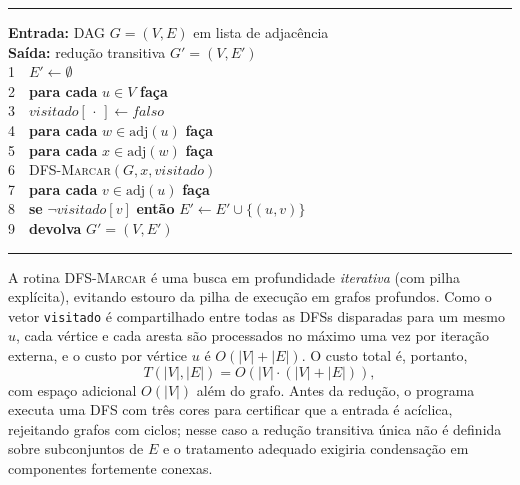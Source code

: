 \documentclass{sbc2023}%
\begin{document}
\begin{algoritmo}
\caption{Redução transitiva por caminhamento}
\label{alg:rt}
\hrule\vspace{1.5mm}
{\small
\textbf{Entrada:} DAG $G=(V,E)$ em lista de adjacência\\
\textbf{Saída:} redução transitiva $G'=(V,E')$\\[1mm]
\hspace*{0mm}1\ \ $E' \gets \emptyset$\\
\hspace*{0mm}2\ \ \textbf{para cada} $u \in V$ \textbf{faça}\\
\hspace*{4mm}3\ \ $\mathit{visitado}[\,\cdot\,] \gets \mathit{falso}$\\
\hspace*{4mm}4\ \ \textbf{para cada} $w \in \mathrm{adj}(u)$ \textbf{faça}\\
\hspace*{8mm}5\ \ \textbf{para cada} $x \in \mathrm{adj}(w)$ \textbf{faça}\\
\hspace*{12mm}6\ \ \textsc{DFS-Marcar}$(G, x, \mathit{visitado})$\\
\hspace*{4mm}7\ \ \textbf{para cada} $v \in \mathrm{adj}(u)$ \textbf{faça}\\
\hspace*{8mm}8\ \ \textbf{se} $\neg\mathit{visitado}[v]$ \textbf{então} $E' \gets E' \cup \{(u,v)\}$\\
\hspace*{0mm}9\ \ \textbf{devolva} $G'=(V,E')$
}
\vspace{1.5mm}\hrule
\end{algoritmo}

A rotina \textsc{DFS-Marcar} é uma busca em profundidade \emph{iterativa} (com pilha explícita), evitando estouro da pilha de execução em grafos profundos. Como o vetor \texttt{visitado} é compartilhado entre todas as DFSs disparadas para um mesmo $u$, cada vértice e cada aresta são processados no máximo uma vez por iteração externa, e o custo por vértice $u$ é $O(|V|+|E|)$. O custo total é, portanto,
\[
T(|V|,|E|) = O\!\left(|V|\cdot(|V|+|E|)\right),
\]
com espaço adicional $O(|V|)$ além do grafo. Antes da redução, o programa executa uma DFS com três cores para certificar que a entrada é acíclica, rejeitando grafos com ciclos; nesse caso a redução transitiva única não é definida sobre subconjuntos de $E$ e o tratamento adequado exigiria condensação em componentes fortemente conexas.
\end{document}
